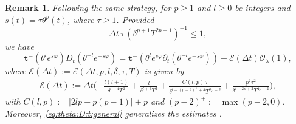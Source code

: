 \documentclass[11pt,oneside,leqno]{amsart}
\numberwithin{equation}{section}
\numberwithin{equation}{section}
\newtheorem{remark}[theorem]{Remark}
\newcommand{\trm}{\mathtt t^-}
\begin{document}
\begin{remark}
    Following the same strategy, for $p\geq 1$ and $l\geq 0$ be integers and $s(t)=\tau\theta^{p}(t)$, where $\tau\geq 1$. Provided 
    \begin{equation}\label{eq:hypothesis:general}
    \Delta t\,\tau\,(\delta^{p+1}T^{2p+1})^{-1}\leq 1,
    \end{equation}
    we have
    \begin{equation}\label{eq:theta:D:t:general}
        \trm(\theta^{l}e^{s\varphi})D_{t}(\theta^{-l}e^{-s\varphi})=\trm(\theta^{l}e^{s\varphi}\partial_{t}(\theta^{-l}e^{-s\varphi}))+\mathcal{E}(\Delta t) \mathcal{O}_{\lambda}(1),
    \end{equation}
    where $\mathcal{E}(\Delta t):=\mathcal{E}(\Delta t, p, l,\delta,\tau,T)$ is given by
    \begin{equation*}
    \begin{aligned}
    \mathcal{E}(\Delta t):=\Delta t\bigg(&\frac{l(l+1)}{\delta^{l+4}T^{2}}+\frac{l}{\delta^{l+3}T^{2}}+\frac{C(l,p)\,\tau}{\delta^{l+(p-2)^{+}+4}T^{2p+2}}+\frac{p^{2}\tau^{2}}{\delta^{l+2p+2}T^{4p+2}}\bigg),
    \end{aligned}
    \end{equation*}
    with $C(l,p):=|2lp-p(p-1)|+p$ and $(p-2)^{+}:=\max(p-2,0)$.\\
    Moreover, \eqref{eq:theta:D:t:general} generalizes the estimates \cite[Lemma B.4]{BHS:2020}.
\end{remark}
\end{document}
